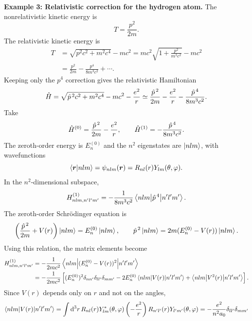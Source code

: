 \textbf{Example 3: Relativistic correction for the hydrogen atom.}
The nonrelativistic kinetic energy is
\begin{equation}
 T=\frac{p^2}{2m}.
\end{equation}
The relativistic kinetic energy is
\begin{equation}\begin{aligned}
 T&=\sqrt{p^2c^2+m^2c^4}-mc^2
 =mc^2\sqrt{1+\frac{p^2}{m^2c^2}}-mc^2\\
 &=\frac{p^2}{2m}-\frac{p^4}{8m^3c^2}+\cdots.
\end{aligned}\end{equation}
Keeping only the $p^4$ correction gives the relativistic Hamiltonian
\begin{equation}
 \hat{H}=\sqrt{\hat{p}^{\,2}c^2+m^2c^4}-mc^2-\frac{e^2}{r}
 \simeq \frac{\hat{p}^{\,2}}{2m}-\frac{e^2}{r}
 -\frac{\hat{p}^{\,4}}{8m^3c^2}.
\end{equation}
Take
\begin{equation}
 \hat{H}^{(0)}=\frac{\hat{p}^{\,2}}{2m}-\frac{e^2}{r},\qquad
 \hat{H}^{(1)}=-\frac{\hat{p}^{\,4}}{8m^3c^2}.
\end{equation}
The zeroth-order energy is $E_n^{(0)}$ and the $n^2$ eigenstates are $\left|nlm\right\rangle$, with wavefunctions
\begin{equation}
 \left\langle\bm{r}\middle|nlm\right\rangle=\psi_{nlm}(\bm{r})=R_{nl}(r)Y_{lm}(\theta,\varphi).
\end{equation}
In the $n^2$-dimensional subspace,
\begin{equation}
 H_{nlm,n'l'm'}^{(1)}=-\frac{1}{8m^3c^2}
 \left\langle nlm\middle|\hat{p}^{\,4}\middle|n'l'm'\right\rangle.
\end{equation}
The zeroth-order Schr\"odinger equation is
\begin{equation}
 \left(\frac{\hat{p}^{\,2}}{2m}+V(r)\right)\left|nlm\right\rangle
 =E_n^{(0)}\left|nlm\right\rangle,
 \qquad
 \hat{p}^{\,2}\left|nlm\right\rangle=2m(E_n^{(0)}-V(r))\left|nlm\right\rangle.
\end{equation}
Using this relation, the matrix elements become
\begin{equation}\begin{aligned}
 H_{nlm,n'l'm'}^{(1)}
 &=-\frac{1}{2mc^2}\left\langle nlm\middle|(E_n^{(0)}-V(r))^2\middle|n'l'm'\right\rangle\\
 &=-\frac{1}{2mc^2}\left[
 (E_n^{(0)})^2\delta_{nn'}\delta_{ll'}\delta_{mm'}
 -2E_n^{(0)}\left\langle nlm\middle|V(r)\middle|n'l'm'\right\rangle
 +\left\langle nlm\middle|V^2(r)\middle|n'l'm'\right\rangle\right].
\end{aligned}\end{equation}
Since $V(r)$ depends only on $r$ and not on the angles,
\begin{equation}
 \left\langle nlm\middle|V(r)\middle|n'l'm'\right\rangle
 =\int\mathrm{d}^3r\,R_{nl}(r)Y_{lm}^*(\theta,\varphi)
 \left(-\frac{e^2}{r}\right)R_{n'l'}(r)Y_{l'm'}(\theta,\varphi)
 =-\frac{e^2}{n^2a_0}\delta_{ll'}\delta_{mm'}
\end{equation}
